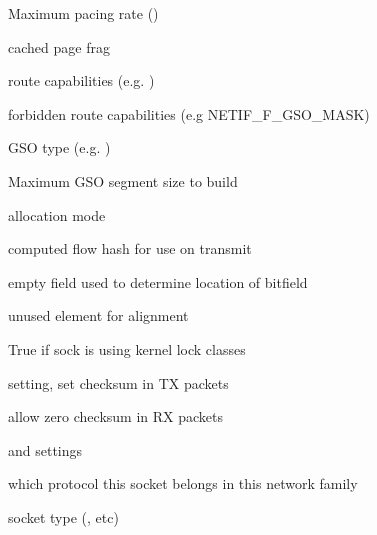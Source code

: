 \documentclass[a4paper,8pt,english]{sphinxmanual}
\begin{document}
\begin{description}
\item[{}] \leavevmode
Maximum pacing rate ()

\item[{}] \leavevmode
cached page frag

\item[{}] \leavevmode
route capabilities (e.g. )

\item[{}] \leavevmode
forbidden route capabilities (e.g NETIF\_F\_GSO\_MASK)

\item[{}] \leavevmode
GSO type (e.g. )

\item[{}] \leavevmode
Maximum GSO segment size to build

\item[{}] \leavevmode
allocation mode

\item[{}] \leavevmode
computed flow hash for use on transmit

\item[{}] \leavevmode
empty field used to determine location of bitfield

\item[{}] \leavevmode
unused element for alignment

\item[{}] \leavevmode
True if sock is using kernel lock classes

\item[{}] \leavevmode
{} setting, set checksum in TX packets

\item[{}] \leavevmode
allow zero checksum in RX packets

\item[{}] \leavevmode
{} and  settings

\item[{}] \leavevmode
which protocol this socket belongs in this network family

\item[{}] \leavevmode
socket type (, etc)


\end{description}
\end{document}
